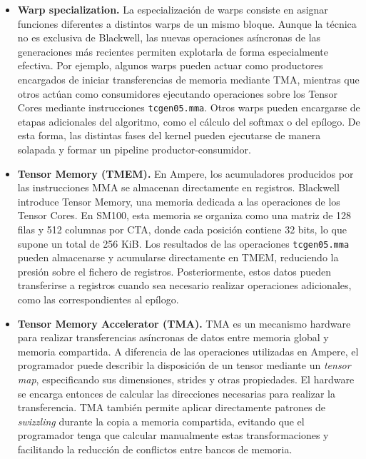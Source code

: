 \begin{itemize}

```
\item \textbf{Warp specialization.}
La especialización de warps consiste en asignar funciones diferentes a distintos warps de un mismo bloque. Aunque la técnica no es exclusiva de Blackwell, las nuevas operaciones asíncronas de las generaciones más recientes permiten explotarla de forma especialmente efectiva. Por ejemplo, algunos warps pueden actuar como productores encargados de iniciar transferencias de memoria mediante TMA, mientras que otros actúan como consumidores ejecutando operaciones sobre los Tensor Cores mediante instrucciones \texttt{tcgen05.mma}. Otros warps pueden encargarse de etapas adicionales del algoritmo, como el cálculo del softmax o del epílogo. De esta forma, las distintas fases del kernel pueden ejecutarse de manera solapada y formar un pipeline productor-consumidor.

\item \textbf{Tensor Memory (TMEM).}
En Ampere, los acumuladores producidos por las instrucciones MMA se almacenan directamente en registros. Blackwell introduce Tensor Memory, una memoria dedicada a las operaciones de los Tensor Cores. En SM100, esta memoria se organiza como una matriz de 128 filas y 512 columnas por CTA, donde cada posición contiene 32 bits, lo que supone un total de 256 KiB. Los resultados de las operaciones \texttt{tcgen05.mma} pueden almacenarse y acumularse directamente en TMEM, reduciendo la presión sobre el fichero de registros. Posteriormente, estos datos pueden transferirse a registros cuando sea necesario realizar operaciones adicionales, como las correspondientes al epílogo.

\item \textbf{Tensor Memory Accelerator (TMA).}
TMA es un mecanismo hardware para realizar transferencias asíncronas de datos entre memoria global y memoria compartida. A diferencia de las operaciones utilizadas en Ampere, el programador puede describir la disposición de un tensor mediante un \textit{tensor map}, especificando sus dimensiones, strides y otras propiedades. El hardware se encarga entonces de calcular las direcciones necesarias para realizar la transferencia. TMA también permite aplicar directamente patrones de \textit{swizzling} durante la copia a memoria compartida, evitando que el programador tenga que calcular manualmente estas transformaciones y facilitando la reducción de conflictos entre bancos de memoria.


\end{itemize}
